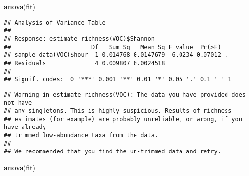 \documentclass[]{article}
\newenvironment{Shaded}{\begin{snugshade}}{\end{snugshade}}
\newcommand{\KeywordTok}[1]{\textcolor[rgb]{0.13,0.29,0.53}{\textbf{#1}}}
\newcommand{\StringTok}[1]{\textcolor[rgb]{0.31,0.60,0.02}{#1}}
\newcommand{\CommentTok}[1]{\textcolor[rgb]{0.56,0.35,0.01}{\textit{#1}}}
\newcommand{\OperatorTok}[1]{\textcolor[rgb]{0.81,0.36,0.00}{\textbf{#1}}}
\newcommand{\NormalTok}[1]{#1}
\begin{document}
\begin{Shaded}
\begin{Highlighting}[]
\KeywordTok{anova}\NormalTok{(fit)}
\end{Highlighting}
\end{Shaded}

\begin{verbatim}
## Analysis of Variance Table
## 
## Response: estimate_richness(VOC)$Shannon
##                       Df   Sum Sq   Mean Sq F value  Pr(>F)  
## sample_data(VOC)$hour  1 0.014768 0.0147679  6.0234 0.07012 .
## Residuals              4 0.009807 0.0024518                  
## ---
## Signif. codes:  0 '***' 0.001 '**' 0.01 '*' 0.05 '.' 0.1 ' ' 1
\end{verbatim}

\begin{Shaded}
\end{Shaded}

\begin{verbatim}
## Warning in estimate_richness(VOC): The data you have provided does not have
## any singletons. This is highly suspicious. Results of richness
## estimates (for example) are probably unreliable, or wrong, if you have already
## trimmed low-abundance taxa from the data.
## 
## We recommended that you find the un-trimmed data and retry.
\end{verbatim}

\begin{Shaded}
\begin{Highlighting}[]
\KeywordTok{anova}\NormalTok{(fit)}
\end{Highlighting}
\end{Shaded}
\end{document}
